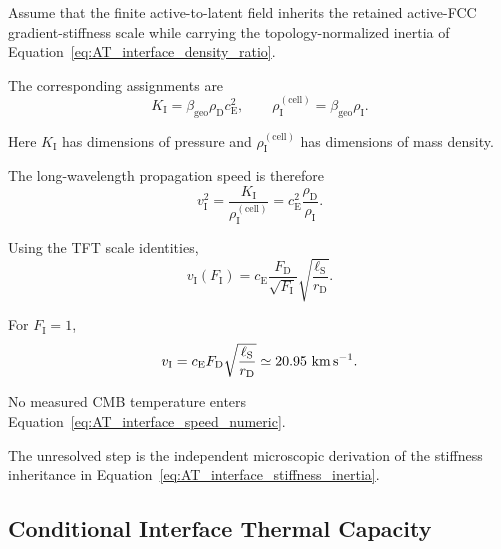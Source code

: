 Assume that the finite active-to-latent field inherits the retained active-FCC
gradient-stiffness scale while carrying the topology-normalized inertia of
Equation~\eqref{eq:AT_interface_density_ratio}.

The corresponding assignments are
\begin{equation}
    K_{\mathrm I}
    =
    \beta_{\mathrm{geo}}
    \rho_{\mathrm D}
    c_{\mathrm E}^2,
    \qquad
    \rho_{\mathrm I}^{(\mathrm{cell})}
    =
    \beta_{\mathrm{geo}}
    \rho_{\mathrm I}.
    \label{eq:AT_interface_stiffness_inertia}
\end{equation}

Here
\(K_{\mathrm I}\)
has dimensions of pressure and
\(\rho_{\mathrm I}^{(\mathrm{cell})}\)
has dimensions of mass density.

The long-wavelength propagation speed is therefore
\begin{equation}
    v_{\mathrm I}^2
    =
    \frac{
        K_{\mathrm I}
    }{
        \rho_{\mathrm I}^{(\mathrm{cell})}
    }
    =
    c_{\mathrm E}^2
    \frac{
        \rho_{\mathrm D}
    }{
        \rho_{\mathrm I}
    }.
    \label{eq:AT_interface_speed_density}
\end{equation}

Using the TFT scale identities,
\begin{equation}
    v_{\mathrm I}(F_{\mathrm I})
    =
    c_{\mathrm E}
    \frac{
        F_{\mathrm D}
    }{
        \sqrt{F_{\mathrm I}}
    }
    \sqrt{
        \frac{
            \ell_{\mathrm S}
        }{
            r_{\mathrm D}
        }
    }.
    \label{eq:AT_interface_speed}
\end{equation}

For
\(F_{\mathrm I}=1\),
\begin{equation}
    v_{\mathrm I}
    =
    c_{\mathrm E}
    F_{\mathrm D}
    \sqrt{
        \frac{
            \ell_{\mathrm S}
        }{
            r_{\mathrm D}
        }
    }
    \simeq
    20.95~{\rm km\,s^{-1}}.
    \label{eq:AT_interface_speed_numeric}
\end{equation}

No measured CMB temperature enters
Equation~\eqref{eq:AT_interface_speed_numeric}.

The unresolved step is the independent microscopic derivation of the
stiffness inheritance in
Equation~\eqref{eq:AT_interface_stiffness_inertia}.


\subsection{Conditional Interface Thermal Capacity}

